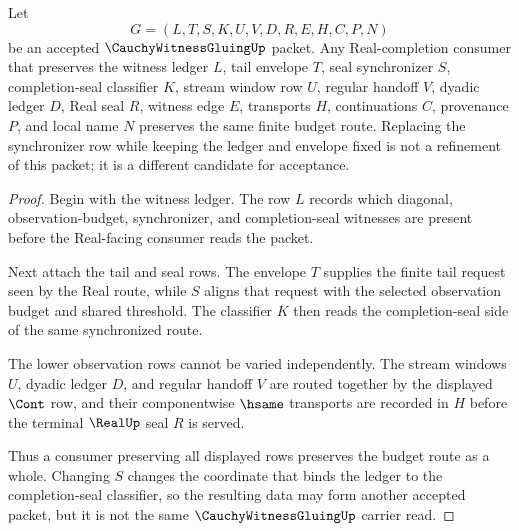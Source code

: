 \begin{theorem}
\label{thm:cauchy-witness-gluing-budget-compatibility}
Let
$$
G=(L,T,S,K,U,V,D,R,E,H,C,P,N)
$$
be an accepted $\CauchyWitnessGluingUp$ packet. Any Real-completion consumer that preserves the witness ledger $L$, tail envelope $T$, seal synchronizer $S$, completion-seal classifier $K$, stream window row $U$, regular handoff $V$, dyadic ledger $D$, Real seal $R$, witness edge $E$, transports $H$, continuations $C$, provenance $P$, and local name $N$ preserves the same finite budget route. Replacing the synchronizer row while keeping the ledger and envelope fixed is not a refinement of this packet; it is a different candidate for acceptance.
\end{theorem}
\begin{proof}
Begin with the witness ledger. The row $L$ records which diagonal, observation-budget, synchronizer, and completion-seal witnesses are present before the Real-facing consumer reads the packet.

Next attach the tail and seal rows. The envelope $T$ supplies the finite tail request seen by the Real route, while $S$ aligns that request with the selected observation budget and shared threshold. The classifier $K$ then reads the completion-seal side of the same synchronized route.

The lower observation rows cannot be varied independently. The stream windows $U$, dyadic ledger $D$, and regular handoff $V$ are routed together by the displayed $\Cont$ row, and their componentwise $\hsame$ transports are recorded in $H$ before the terminal $\RealUp$ seal $R$ is served.

Thus a consumer preserving all displayed rows preserves the budget route as a whole. Changing $S$ changes the coordinate that binds the ledger to the completion-seal classifier, so the resulting data may form another accepted packet, but it is not the same $\CauchyWitnessGluingUp$ carrier read.
\end{proof}

